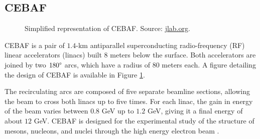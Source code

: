 \subsection{CEBAF} \label{ssec::cebaf}
    \begin{figure}[b!]
        \centering{}
        \caption[CEBAF.]{Simplified representation of CEBAF.
        Source: \hyperlink{https://www.jlab.org/}{jlab.org}.}
        \label{fig::cebaf}
    \end{figure}

    CEBAF is a pair of $1.4$-km antiparallel superconducting radio-frequency (RF) linear accelerators (linacs) built 8 meters below the surface.
    Both accelerators are joined by two $180\degree$ arcs, which have a radius of $80$ meters \cite{leemann2001} each.
    A figure detailing the design of CEBAF is available in Figure \ref{fig::cebaf}.

    The recirculating arcs are composed of five separate beamline sections, allowing the beam to cross both linacs up to five times.
    For each linac, the gain in energy of the beam varies between $0.8$ GeV up to $1.2$ GeV, giving it a final energy of about $12$ GeV.
    CEBAF is designed for the experimental study of the structure of mesons, nucleons, and nuclei through the high energy electron beam \cite{rode2010}.
